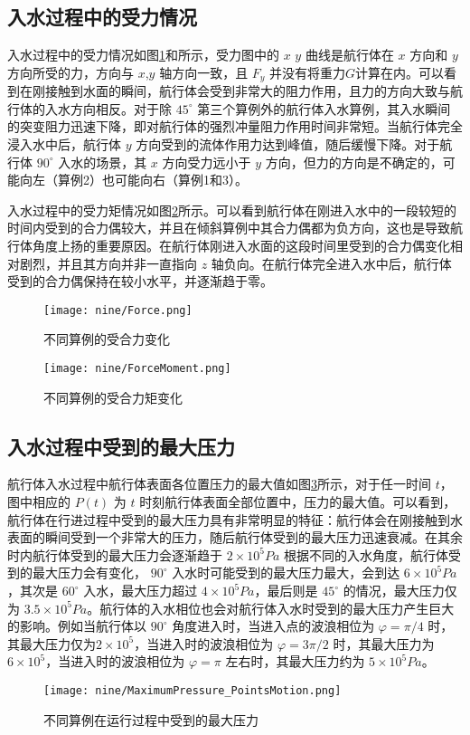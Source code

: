 \subsection{入水过程中的受力情况}

入水过程中的受力情况如图\ref{fig:nine_force}和所示，受力图中的 $x$ $y$ 曲线是航行体在 $x$ 方向和 $y$ 方向所受的力，方向与 $x$,$y$ 轴方向一致，且 $F_y$ 并没有将重力$G$计算在内。可以看到在刚接触到水面的瞬间，航行体会受到非常大的阻力作用，且力的方向大致与航行体的入水方向相反。对于除 $45^\circ$ 第三个算例外的航行体入水算例，其入水瞬间的突变阻力迅速下降，即对航行体的强烈冲量阻力作用时间非常短。当航行体完全浸入水中后，航行体 $y$ 方向受到的流体作用力达到峰值，随后缓慢下降。对于航行体 $90 ^\circ$ 入水的场景，其 $x$ 方向受力远小于 $y$ 方向，但力的方向是不确定的，可能向左（算例2）也可能向右（算例1和3）。

入水过程中的受力矩情况如图\ref{fig:nine_forcemoment}所示。可以看到航行体在刚进入水中的一段较短的时间内受到的合力偶较大，并且在倾斜算例中其合力偶都为负方向，这也是导致航行体角度上扬的重要原因。在航行体刚进入水面的这段时间里受到的合力偶变化相对剧烈，并且其方向并非一直指向 $z$ 轴负向。在航行体完全进入水中后，航行体受到的合力偶保持在较小水平，并逐渐趋于零。

\begin{figure}[!htp]
  \centering
  \texttt{[image: nine/Force.png]}
  \caption{不同算例的受合力变化}
  \label{fig:nine_force}
\end{figure}

\begin{figure}[!htp]
  \centering
  \texttt{[image: nine/ForceMoment.png]}
  \caption{不同算例的受合力矩变化}
  \label{fig:nine_forcemoment}
\end{figure}

\subsection{入水过程中受到的最大压力}

航行体入水过程中航行体表面各位置压力的最大值如图\ref{fig:nine_max}所示，对于任一时间 $t$，图中相应的 $P(t)$ 为 $t$ 时刻航行体表面全部位置中，压力的最大值。可以看到，航行体在行进过程中受到的最大压力具有非常明显的特征：航行体会在刚接触到水表面的瞬间受到一个非常大的压力，随后航行体受到的最大压力迅速衰减。在其余时内航行体受到的最大压力会逐渐趋于 $2 \times 10^5 Pa$ 根据不同的入水角度，航行体受到的最大压力会有变化， $90 ^\circ$ 入水时可能受到的最大压力最大，会到达 $6 \times 10^5 Pa$，其次是 $60 ^\circ$ 入水，最大压力超过 $4 \times 10^5 Pa$，最后则是 $45 ^\circ$ 的情况，最大压力仅为 $3.5 \times 10^5 Pa$。航行体的入水相位也会对航行体入水时受到的最大压力产生巨大的影响。例如当航行体以 $90 ^\circ$ 角度进入时，当进入点的波浪相位为 $\varphi = \pi /4$ 时，其最大压力仅为$2 \times 10^5$，当进入时的波浪相位为 $\varphi = 3 \pi / 2$ 时，其最大压力为$6 \times 10^5$，当进入时的波浪相位为 $\varphi = \pi$ 左右时，其最大压力约为 $5 \times 10^5 Pa$。
\begin{figure}[!htp]
  \centering
  \texttt{[image: nine/MaximumPressure\_PointsMotion.png]}
  \caption{不同算例在运行过程中受到的最大压力}
  \label{fig:nine_max}
\end{figure}
